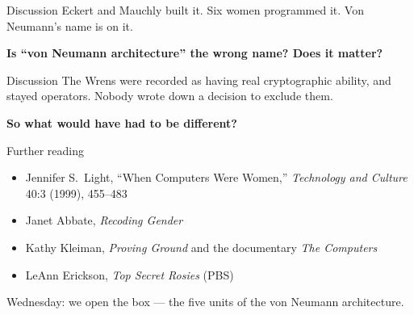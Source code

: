 \documentclass[aspectratio=169,11pt]{beamer}
\newcommand{\thread}[1]{{\color{accent}\bfseries #1}}
\begin{document}
\begin{frame}{Discussion}
\LARGE
Eckert and Mauchly built it. Six women programmed it. Von Neumann's name is on it.\par\vspace{1.2em}
\thread{Is ``von Neumann architecture'' the wrong name? Does it matter?}
\end{frame}

\begin{frame}{Discussion}
\LARGE
The Wrens were recorded as having real cryptographic ability, and stayed operators. Nobody wrote down a decision to exclude them.\par\vspace{1.2em}
\thread{So what would have had to be different?}
\end{frame}

\begin{frame}{Further reading}
\large
\begin{itemize}\setlength\itemsep{0.8em}
\item Jennifer S.\ Light, ``When Computers Were Women,'' \emph{Technology and Culture} 40:3 (1999), 455--483
\item Janet Abbate, \emph{Recoding Gender}
\item Kathy Kleiman, \emph{Proving Ground} and the documentary \emph{The Computers}
\item LeAnn Erickson, \emph{Top Secret Rosies} (PBS)
\end{itemize}
\vfill
{\color{muted}\normalsize Wednesday: we open the box --- the five units of the von Neumann architecture.}
\end{frame}
\end{document}
